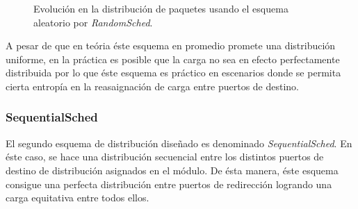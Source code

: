 \begin{figure}[th!]
\centering
{}
\caption{Evolución en la distribución de paquetes usando el esquema aleatorio por \emph{RandomSched}.}
\label{fig:RandomSched}
\end{figure}

A pesar de que en teória éste esquema en promedio promete una distribución uniforme, en la práctica es posible que la carga no sea en efecto perfectamente distribuida por lo que éste esquema es práctico en escenarios donde se permita cierta entropía en la reasaignación de carga entre puertos de destino.

\subsubsection{SequentialSched}
El segundo esquema de distribución diseñado es denominado \emph{SequentialSched}. En éste caso, se hace una distribución secuencial entre los distintos puertos de destino de distribución asignados en el módulo. De ésta manera, éste esquema consigue una perfecta distribución entre puertos de redirección logrando una carga equitativa entre todos ellos.

